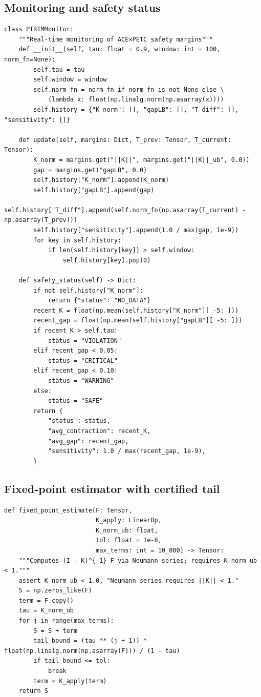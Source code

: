 \documentclass[11pt]{article}
\theoremstyle{plain}
\theoremstyle{definition}
\theoremstyle{remark}
\begin{document}
\subsection{Monitoring and safety status}
\begin{lstlisting}[style=py,caption={Real-time ACE margins monitor}]
class PIRTMMonitor:
    """Real-time monitoring of ACE×PETC safety margins"""
    def __init__(self, tau: float = 0.9, window: int = 100, norm_fn=None):
        self.tau = tau
        self.window = window
        self.norm_fn = norm_fn if norm_fn is not None else \
            (lambda x: float(np.linalg.norm(np.asarray(x))))
        self.history = {"K_norm": [], "gapLB": [], "T_diff": [], "sensitivity": []}

    def update(self, margins: Dict, T_prev: Tensor, T_current: Tensor):
        K_norm = margins.get("||K||", margins.get("||K||_ub", 0.0))
        gap = margins.get("gapLB", 0.0)
        self.history["K_norm"].append(K_norm)
        self.history["gapLB"].append(gap)
        self.history["T_diff"].append(self.norm_fn(np.asarray(T_current) - np.asarray(T_prev)))
        self.history["sensitivity"].append(1.0 / max(gap, 1e-9))
        for key in self.history:
            if len(self.history[key]) > self.window:
                self.history[key].pop(0)

    def safety_status(self) -> Dict:
        if not self.history["K_norm"]:
            return {"status": "NO_DATA"}
        recent_K = float(np.mean(self.history["K_norm"][ -5: ]))
        recent_gap = float(np.mean(self.history["gapLB"][ -5: ]))
        if recent_K > self.tau:
            status = "VIOLATION"
        elif recent_gap < 0.05:
            status = "CRITICAL"
        elif recent_gap < 0.10:
            status = "WARNING"
        else:
            status = "SAFE"
        return {
            "status": status,
            "avg_contraction": recent_K,
            "avg_gap": recent_gap,
            "sensitivity": 1.0 / max(recent_gap, 1e-9),
        }
\end{lstlisting}

\subsection{Fixed-point estimator with certified tail}
\begin{lstlisting}[style=py,caption={(I - K)^{-1}F via Neumann series with tail certificate}]
def fixed_point_estimate(F: Tensor,
                         K_apply: LinearOp,
                         K_norm_ub: float,
                         tol: float = 1e-8,
                         max_terms: int = 10_000) -> Tensor:
    """Computes (I - K)^{-1} F via Neumann series; requires K_norm_ub < 1."""
    assert K_norm_ub < 1.0, "Neumann series requires ||K|| < 1."
    S = np.zeros_like(F)
    term = F.copy()
    tau = K_norm_ub
    for j in range(max_terms):
        S = S + term
        tail_bound = (tau ** (j + 1)) * float(np.linalg.norm(np.asarray(F))) / (1 - tau)
        if tail_bound <= tol:
            break
        term = K_apply(term)
    return S
\end{lstlisting}
\end{document}
